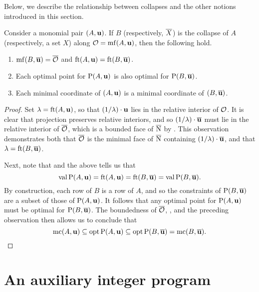\documentclass[11pt]{amsart}
\begin{document}
Below, we describe the relationship between collapses and the other notions introduced in this section.

\begin{corollary}
\label{collapse of mf and mc: C}
Consider a monomial pair $(A, \mathbf{u})$.  If $B$ (respectively, $\overline{X}$) is the collapse of $A$ (respectively, a set $X$) along $\mathcal{O} = \operatorname{mf}(A, \mathbf{u})$, then the following hold.

\begin{enumerate}
\item $\operatorname{mf}(B, \overline{\mathbf{u}}) = \overline{\mathcal{O}}$ and $\operatorname{ft}(A, \mathbf{u}) = \operatorname{ft}(B, \overline{\mathbf{u}})$.
\item Each optimal point for $\mathrm{P}(A, \mathbf{u})$ is also optimal for $\mathrm{P}(B, \overline{\mathbf{u}})$.  
\item Each minimal coordinate of $(A, \mathbf{u})$ is a minimal coordinate of $(B, \overline{\mathbf{u}})$.
\end{enumerate}
\end{corollary}

\begin{proof}
Set $\lambda = \operatorname{ft}(A, \mathbf{u})$, so that $(1 / \lambda) \cdot \mathbf{u}$ lies in the relative interior of $\mathcal{O}$.  It is clear that projection preserves relative interiors, and so $(1/\lambda) \cdot \overline{\mathbf{u}}$ must lie in the relative interior of $\overline{\mathcal{O}}$, which is a bounded face of $\overline{\mathrm{N}}$ by .  This observation demonstrates both that $\overline{\mathcal{O}}$ is the minimal face of $\overline{\mathrm{N}}$ containing $(1/\lambda) \cdot \overline{\mathbf{u}}$, and that $\lambda = \operatorname{ft}(B, \overline{\mathbf{u}})$.  

Next, note that  and the above tells us that \[ \operatorname{val} \mathrm{P}(A, \mathbf{u}) = \operatorname{ft}(A, \mathbf{u}) = \operatorname{ft}(B, \overline{\mathbf{u}}) = \operatorname{val} \mathrm{P}(B, \overline{\mathbf{u}}). \] 
%
By construction, each row of $B$ is a row of $A$, and so the constraints of $\mathrm{P}(B, \overline{\mathbf{u}})$ are a subset of those of $\mathrm{P}(A, \mathbf{u})$.  It follows that any optimal point for $\mathrm{P}(A, \mathbf{u})$ must be optimal for $\mathrm{P}(B, \overline{\mathbf{u}})$.  The boundedness of $\overline{\mathcal{O}}$, , and the preceding observation then allows us to conclude that
\[ \operatorname{mc}(A, \mathbf{u}) \subseteq \operatorname{opt} \mathrm{P}(A, \mathbf{u}) \subseteq \operatorname{opt} \mathrm{P}(B, \overline{\mathbf{u}}) = \operatorname{mc}(B, \overline{\mathbf{u}}).\] 
\end{proof}




\newpage
\section{An auxiliary integer program}
\end{document}
